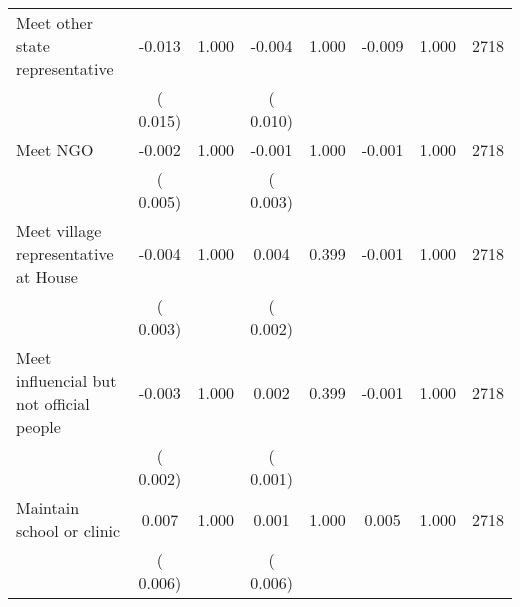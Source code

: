 \begin{tabular}{l*{7}{c}}
 Meet other state representative       &             -0.013       &        1.000  &             -0.004       &        1.000  &             -0.009       &              1.000 &  2718 \\ 
                       &       (       0.015)             &                               &       (       0.010)                     &                               &                                               &                                &                      \\ 

 Meet NGO       &             -0.002       &        1.000  &             -0.001       &        1.000  &             -0.001       &              1.000 &  2718 \\ 
                       &       (       0.005)             &                               &       (       0.003)                     &                               &                                               &                                &                      \\ 

 Meet village representative at House       &             -0.004       &        1.000  &              0.004       &        0.399  &             -0.001       &              1.000 &  2718 \\ 
                       &       (       0.003)             &                               &       (       0.002)                     &                               &                                               &                                &                      \\ 

 Meet influencial but not official people       &             -0.003       &        1.000  &              0.002       &        0.399  &             -0.001       &              1.000 &  2718 \\ 
                       &       (       0.002)             &                               &       (       0.001)                     &                               &                                               &                                &                      \\ 

 Maintain school or clinic       &              0.007       &        1.000  &              0.001       &        1.000  &              0.005       &              1.000 &  2718 \\ 
                       &       (       0.006)             &                               &       (       0.006)                     &                               &                                               &                                &                      \\ 


\end{tabular}
